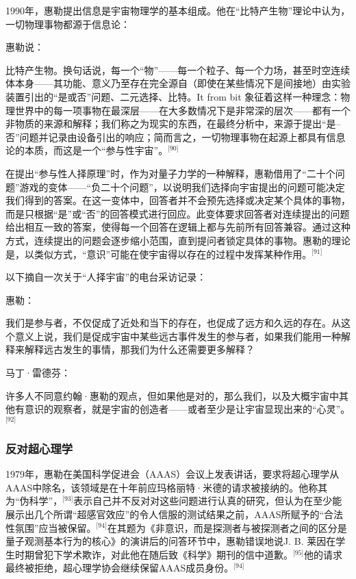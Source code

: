 1990年，惠勒提出信息是宇宙物理学的基本组成。他在“比特产生物”理论中认为，一切物理事物都源于信息论：

惠勒说：

比特产生物。换句话说，每一个“物”——每一个粒子、每一个力场，甚至时空连续体本身——其功能、意义乃至存在完全源自（即使在某些情况下是间接地）由实验装置引出的“是或否”问题、二元选择、比特。It from bit 象征着这样一种理念：物理世界中的每一项事物在最深层——在大多数情况下是非常深的层次——都有一个非物质的来源和解释；我们称之为现实的东西，在最终分析中，来源于提出“是–否”问题并记录由设备引出的响应；简而言之，一切物理事物在起源上都具有信息论的本质，而这是一个“参与性宇宙”。\(^\text{[90]}\)

在提出“参与性人择原理”时，作为对量子力学的一种解释，惠勒借用了“二十个问题”游戏的变体——“负二十个问题”，以说明我们选择向宇宙提出的问题可能决定我们得到的答案。在这一变体中，回答者并不会预先选择或决定某个具体的事物，而是只根据“是”或“否”的回答模式进行回应。此变体要求回答者对连续提出的问题给出相互一致的答案，使得每一个回答在逻辑上都与先前所有回答兼容。通过这种方式，连续提出的问题会逐步缩小范围，直到提问者锁定具体的事物。惠勒的理论是，以类似方式，“意识”可能在使宇宙得以存在的过程中发挥某种作用。\(^\text{[91]}\)

以下摘自一次关于“人择宇宙”的电台采访记录：

惠勒：

我们是参与者，不仅促成了近处和当下的存在，也促成了远方和久远的存在。从这个意义上说，我们是促成宇宙中某些远古事件发生的参与者，如果我们能用一种解释来解释远古发生的事情，那我们为什么还需要更多解释？

马丁·雷德芬：

许多人不同意约翰·惠勒的观点，但如果他是对的，那么我们，以及大概宇宙中其他有意识的观察者，就是宇宙的创造者——或者至少是让宇宙显现出来的“心灵”。\(^\text{[92]}\)
\subsubsection{反对超心理学}
1979年，惠勒在美国科学促进会（AAAS）会议上发表讲话，要求将超心理学从AAAS中除名，该领域是在十年前应玛格丽特·米德的请求被接纳的。他称其为“伪科学”，\(^\text{[93]}\)表示自己并不反对对这些问题进行认真的研究，但认为在至少能展示出几个所谓“超感官效应”的令人信服的测试结果之前，AAAS所赋予的“合法性氛围”应当被保留。\(^\text{[94]}\)在其题为《非意识，而是探测者与被探测者之间的区分是量子观测基本行为的核心》的演讲后的问答环节中，惠勒错误地说J. B. 莱因在学生时期曾犯下学术欺诈，对此他在随后致《科学》期刊的信中道歉。\(^\text{[95]}\)他的请求最终被拒绝，超心理学协会继续保留AAAS成员身份。\(^\text{[94]}\)
